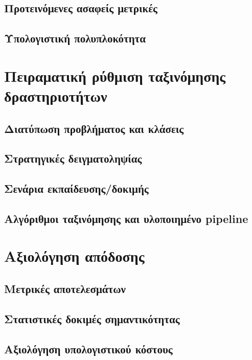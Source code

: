 \subsection{Προτεινόμενες ασαφείς μετρικές}
\subsection{Υπολογιστική πολυπλοκότητα}

\section{Πειραματική ρύθμιση ταξινόμησης δραστηριοτήτων}
\subsection{Διατύπωση προβλήματος και κλάσεις}
\subsection{Στρατηγικές δειγματοληψίας}
\subsection{Σενάρια εκπαίδευσης/δοκιμής}
\subsection{Αλγόριθμοι ταξινόμησης και υλοποιημένο pipeline}

\section{Αξιολόγηση απόδοσης}
\subsection{Μετρικές αποτελεσμάτων}
\subsection{Στατιστικές δοκιμές σημαντικότητας}
\subsection{Αξιολόγηση υπολογιστικού κόστους}

